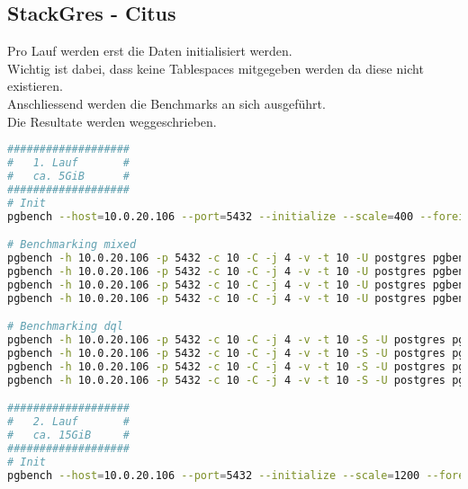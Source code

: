 
\begin{flushleft}
    \subsection{StackGres - Citus}
    \label{subsec:stackgres_citus_benchmarking_commands}
    Pro Lauf werden erst die Daten initialisiert werden.\\
    Wichtig ist dabei, dass keine Tablespaces mitgegeben werden da diese nicht existieren.\\
    Anschliessend werden die Benchmarks an sich ausgeführt.\\
    Die Resultate werden weggeschrieben.
\lstset{style=gra_codestyle}
\begin{lstlisting}[language=bash, caption=StackGres-Citus - Benchmarking-Commands,captionpos=b,label={lst:stackgres_citus-benchmarking-commands},breaklines=true]
###################
#   1. Lauf       #
#   ca. 5GiB      #
###################
# Init
pgbench --host=10.0.20.106 --port=5432 --initialize --scale=400 --foreign-keys --fillfactor=100 --username=dtgvpf  --username=postgres pgbench_eval_bench

# Benchmarking mixed
pgbench -h 10.0.20.106 -p 5432 -c 10 -C -j 4 -v -t 10 -U postgres pgbench_eval_bench > /home/itgramic/1_1_stackgresmixed_benchmark.txt
pgbench -h 10.0.20.106 -p 5432 -c 10 -C -j 4 -v -t 10 -U postgres pgbench_eval_bench > /home/itgramic/1_2_stackgresmixed_benchmark.txt
pgbench -h 10.0.20.106 -p 5432 -c 10 -C -j 4 -v -t 10 -U postgres pgbench_eval_bench > /home/itgramic/1_3_stackgresmixed_benchmark.txt
pgbench -h 10.0.20.106 -p 5432 -c 10 -C -j 4 -v -t 10 -U postgres pgbench_eval_bench > /home/itgramic/1_4_stackgresmixed_benchmark.txt

# Benchmarking dql
pgbench -h 10.0.20.106 -p 5432 -c 10 -C -j 4 -v -t 10 -S -U postgres pgbench_eval_bench > /home/itgramic/1_1_stackgresdql_benchmark.txt
pgbench -h 10.0.20.106 -p 5432 -c 10 -C -j 4 -v -t 10 -S -U postgres pgbench_eval_bench > /home/itgramic/1_2_stackgresdql_benchmark.txt
pgbench -h 10.0.20.106 -p 5432 -c 10 -C -j 4 -v -t 10 -S -U postgres pgbench_eval_bench > /home/itgramic/1_3_stackgresdql_benchmark.txt
pgbench -h 10.0.20.106 -p 5432 -c 10 -C -j 4 -v -t 10 -S -U postgres pgbench_eval_bench > /home/itgramic/1_4_stackgresdql_benchmark.txt

###################
#   2. Lauf       #
#   ca. 15GiB     #
###################
# Init
pgbench --host=10.0.20.106 --port=5432 --initialize --scale=1200 --foreign-keys --fillfactor=100 --username=dtgvpf  --username=postgres pgbench_eval_bench


\end{lstlisting}
\end{flushleft}
